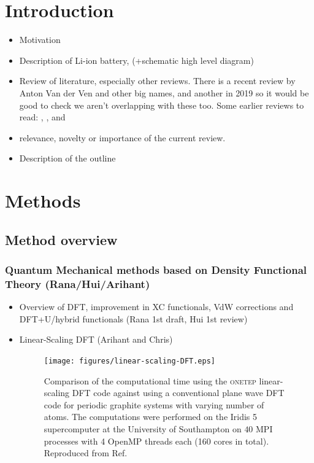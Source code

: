 \documentclass[journal=jacsat,manuscript=article]{achemso}
\newcommand*{\onetep}{\textsc{onetep}}
\begin{document}
\newpage

\tableofcontents
\newpage

\section{Introduction}

\begin{itemize}
    \item Motivation
    \item Description of Li-ion battery, (+schematic high level diagram)
    \item Review of literature, especially other reviews. There is a recent review by Anton Van der Ven and other big names, and another in 2019 so it would be good to check we aren't overlapping with these too. Some earlier reviews to read: \citet[2001]{VanderVen2001}, \citet[2017]{VanderVen2017}, and \citet[2020]{VanderVen2020}
    \item relevance, novelty or importance of the current review.
    \item Description of the outline 
\end{itemize}




\section{Methods}
\subsection{Method overview}
\subsubsection{Quantum Mechanical methods based on Density Functional Theory (Rana/Hui/Arihant)}
\begin{itemize}
    \item Overview of DFT, improvement in XC functionals, VdW corrections and DFT+U/hybrid functionals (Rana 1st draft, Hui 1st review)
    \item Linear-Scaling DFT (Arihant and Chris)
    \begin{figure}
        \centering
        \texttt{[image: figures/linear-scaling-DFT.eps]}
        \caption{Comparison of the computational time using the \onetep{} linear-scaling DFT code against using a conventional plane wave DFT code for periodic graphite systems with varying number of atoms. The computations were performed on the Iridis 5 supercomputer at the University of Southampton on $40$ MPI processes with 4 OpenMP threads each (160 cores in total). Reproduced from Ref. }
        \label{fig:ls}
    \end{figure}
\end{itemize}
\end{document}
